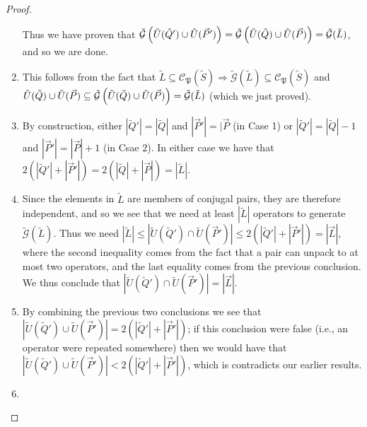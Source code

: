 \documentclass[twocolumn,showpacs,preprintnumbers,amsmath,amssymb,nofootinbib,pra,floatfix]{revtex4-1}
\newcommand{\lst}{\vec}
\newcommand{\set}{\tilde}
\newcommand{\genfun}{\tilde{\mathcal{G}}}
\newcommand{\pauligroup}{\mathfrak{P}}
\newcommand{\centralizer}{\mathcal{C}}
\begin{document}
\begin{proof}
\begin{enumerate}
Thus we have proven that $\genfun\paren{\set U(\set Q')\cup\set U(\lst P')}=\genfun\paren{\set U(\set Q)\cup\set U(\lst P)}=\genfun(\set L)$, and so we are done.
\item

This follows from the fact that $\set L\subseteq\centralizer_\pauligroup(\set S)\Rightarrow\genfun(\set L)\subseteq\centralizer_\pauligroup(\set S)$ and $\set U(\set Q)\cup\set U(\lst P)\subseteq\genfun\paren{\set U(\set Q)\cup\set U(\lst P)}=\genfun(\set L)$ (which we just proved).
\item

By construction, either $|\set Q'|=|\set Q|$ and $|\lst P'|=|\lst P$ (in Case 1) or $|\set Q'|=|\set Q|-1$ and $|\lst P'|=|\lst P|+1$ (in Csae 2).  In either case we have that $2(|\set Q'|+|\lst P'|)=2(|\set Q|+|\lst P|)=|\set L|$.
\item

Since the elements in $\set L$ are members of conjugal pairs, they are therefore independent, and so we see that we need at least $|\set L|$ operators to generate $\genfun(\set L)$.  Thus we need $|\set L|\le|\set U(\set Q')\cap\set U(\lst P')|\le 2(|\set Q'|+|\lst P'|)=|\lst L|$,  where the second inequality comes from the fact that a pair can unpack to at most two operators, and the last equality comes from the previous conclusion.  We thus conclude that $|\set U(\set Q')\cap\set U(\lst P')|=|\lst L|$.
\item

By combining the previous two conclusions we see that $|\set U(\set Q')\cup\set U(\lst P')|=2(|\set Q'|+|\lst P'|)$;  if this conclusion were false (i.e., an operator were repeated somewhere) then we would have that $|\set U(\set Q')\cup\set U(\lst P')|<2(|\set Q'|+|\lst P'|)$, which is contradicts our earlier results.
\item


\end{enumerate}
\end{proof}
\end{document}
